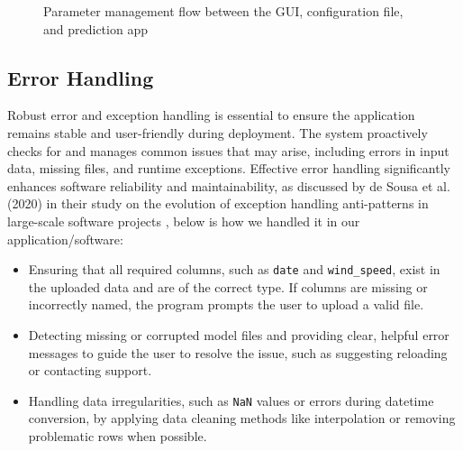 \vspace{0.6cm}

\begin{figure}[H]
	\centering
	\caption{Parameter management flow between the GUI, configuration file, and prediction app}
\end{figure}



\subsection{Error Handling}

Robust error and exception handling is essential to ensure the application remains stable and user-friendly during deployment. The system proactively checks for and manages common issues that may arise, including errors in input data, missing files, and runtime exceptions. Effective error handling significantly enhances software reliability and maintainability, as discussed by de Sousa et al. (2020) in their study on the evolution of exception handling anti-patterns in large-scale software projects \cite{deSousa2020}, below is how we handled it in our application/software:


\begin{itemize}
	\item Ensuring that all required columns, such as \texttt{date} and \texttt{wind\_speed}, exist in the uploaded data and are of the correct type. If columns are missing or incorrectly named, the program prompts the user to upload a valid file.
	\item Detecting missing or corrupted model files and providing clear, helpful error messages to guide the user to resolve the issue, such as suggesting reloading or contacting support.
	\item Handling data irregularities, such as \texttt{NaN} values or errors during datetime conversion, by applying data cleaning methods like interpolation or removing problematic rows when possible.

\end{itemize}

